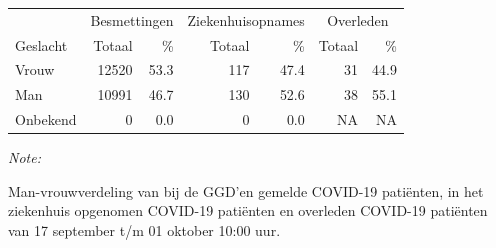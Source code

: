 \documentclass[
  english,
  man,floatsintext]{apa6}
\begin{document}
\begin{table}
\centering\begingroup\fontsize{11}{13}\selectfont

\begin{threeparttable}
\begin{tabular}{lrrrrrr}
\toprule
\multicolumn{1}{c}{ } & \multicolumn{2}{c}{Besmettingen} & \multicolumn{2}{c}{Ziekenhuisopnames} & \multicolumn{2}{c}{Overleden} \\
\cmidrule(l{3pt}r{3pt}){2-3} \cmidrule(l{3pt}r{3pt}){4-5} \cmidrule(l{3pt}r{3pt}){6-7}
Geslacht & Totaal & \% & Totaal & \% & Totaal & \%\\
\midrule
Vrouw & 12520 & 53.3 & 117 & 47.4 & 31 & 44.9\\
Man & 10991 & 46.7 & 130 & 52.6 & 38 & 55.1\\
Onbekend & 0 & 0.0 & 0 & 0.0 & NA & NA\\
\bottomrule
\end{tabular}
\begin{tablenotes}
\item \textit{Note: } 
\item Man-vrouwverdeling van bij de GGD’en gemelde COVID-19 patiënten, in het ziekenhuis opgenomen COVID-19 patiënten en overleden COVID-19 patiënten van 17 september t/m 01 oktober 10:00 uur.
\end{tablenotes}
\end{threeparttable}
\endgroup{}
\end{table}
\newpage
\end{document}
